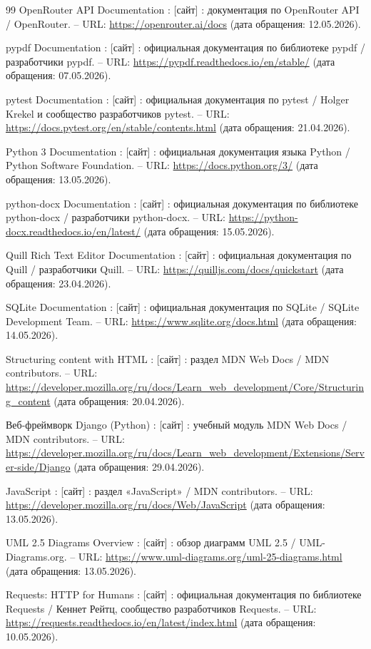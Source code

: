 \begin{thebibliography}{99}
     OpenRouter API Documentation : [сайт] : документация по OpenRouter API / OpenRouter. -- URL: \url{https://openrouter.ai/docs} (дата обращения: 12.05.2026). 

     pypdf Documentation : [сайт] : официальная документация по библиотеке pypdf / разработчики pypdf. -- URL: \url{https://pypdf.readthedocs.io/en/stable/} (дата обращения: 07.05.2026). 

     pytest Documentation : [сайт] : официальная документация по pytest / Holger Krekel и сообщество разработчиков pytest. -- URL: \url{https://docs.pytest.org/en/stable/contents.html} (дата обращения: 21.04.2026). 

     Python 3 Documentation : [сайт] : официальная документация языка Python / Python Software Foundation. -- URL: \url{https://docs.python.org/3/} (дата обращения: 13.05.2026). 

     python-docx Documentation : [сайт] : официальная документация по библиотеке python-docx / разработчики python-docx. -- URL: \url{https://python-docx.readthedocs.io/en/latest/} (дата обращения: 15.05.2026). 

     Quill Rich Text Editor Documentation : [сайт] : официальная документация по Quill / разработчики Quill. -- URL: \url{https://quilljs.com/docs/quickstart} (дата обращения: 23.04.2026). 

     SQLite Documentation : [сайт] : официальная документация по SQLite / SQLite Development Team. -- URL: \url{https://www.sqlite.org/docs.html} (дата обращения: 14.05.2026). 

     Structuring content with HTML : [сайт] : раздел MDN Web Docs / MDN contributors. -- URL: \url{https://developer.mozilla.org/ru/docs/Learn_web_development/Core/Structuring_content} (дата обращения: 20.04.2026). 

     Веб-фреймворк Django (Python) : [сайт] : учебный модуль MDN Web Docs / MDN contributors. -- URL: \url{https://developer.mozilla.org/ru/docs/Learn_web_development/Extensions/Server-side/Django} (дата обращения: 29.04.2026). 

     JavaScript : [сайт] : раздел «JavaScript» / MDN contributors. -- URL: \url{https://developer.mozilla.org/ru/docs/Web/JavaScript} (дата обращения: 13.05.2026).

     UML 2.5 Diagrams Overview : [сайт] : обзор диаграмм UML 2.5 / UML-Diagrams.org. -- URL: \url{https://www.uml-diagrams.org/uml-25-diagrams.html} (дата обращения: 13.05.2026). 

     Requests: HTTP for Humans : [сайт] : официальная документация по библиотеке Requests / Кеннет Рейтц, сообщество разработчиков Requests. -- URL: \url{https://requests.readthedocs.io/en/latest/index.html} (дата обращения: 10.05.2026). 

\end{thebibliography}